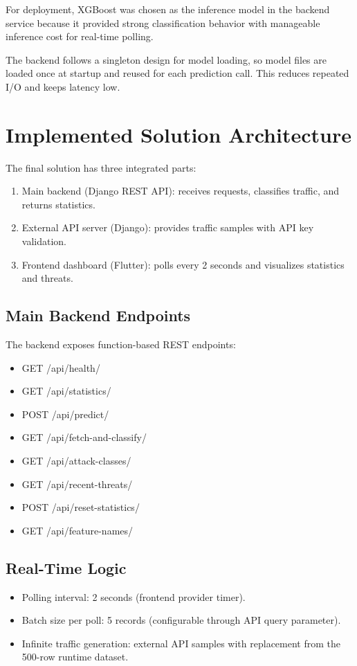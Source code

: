 \documentclass[12pt,a4paper]{article}
\begin{document}
For deployment, XGBoost was chosen as the inference model in the backend service because it provided strong classification behavior with manageable inference cost for real-time polling.

The backend follows a singleton design for model loading, so model files are loaded once at startup and reused for each prediction call. This reduces repeated I/O and keeps latency low.

\section{Implemented Solution Architecture}
The final solution has three integrated parts:
\begin{enumerate}
\item Main backend (Django REST API): receives requests, classifies traffic, and returns statistics.
\item External API server (Django): provides traffic samples with API key validation.
\item Frontend dashboard (Flutter): polls every 2 seconds and visualizes statistics and threats.
\end{enumerate}

\subsection*{Main Backend Endpoints}
The backend exposes function-based REST endpoints:
\begin{itemize}
\item GET /api/health/
\item GET /api/statistics/
\item POST /api/predict/
\item GET /api/fetch-and-classify/
\item GET /api/attack-classes/
\item GET /api/recent-threats/
\item POST /api/reset-statistics/
\item GET /api/feature-names/
\end{itemize}

\subsection*{Real-Time Logic}
\begin{itemize}
\item Polling interval: 2 seconds (frontend provider timer).
\item Batch size per poll: 5 records (configurable through API query parameter).
\item Infinite traffic generation: external API samples with replacement from the 500-row runtime dataset.
\end{itemize}
\end{document}
